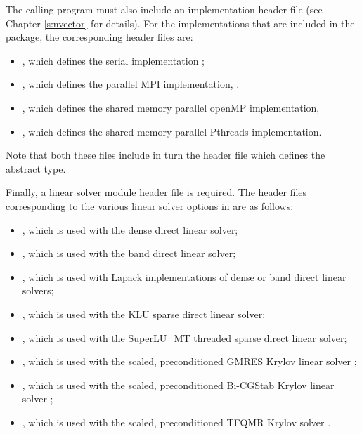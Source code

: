 The calling program must also include an {\nvector} implementation header file
(see Chapter \ref{s:nvector} for details).
For the {\nvector} implementations that are included in the {\idas} package,
the corresponding header files are:
\begin{itemize}
\item {}, 
  which defines the serial implementation {\nvecs};
\item {}, 
  which defines the parallel MPI implementation, {\nvecp}.
\item {},
  which defines the shared memory parallel openMP implementation,
\item {},
  which defines the shared memory parallel Pthreads implementation.
\end{itemize}
Note that both these files include in turn the header file  which 
defines the abstract  type. 

Finally, a linear solver module header file is required. 
The header files corresponding to the various linear solver options in {\idas} are
as follows:
\begin{itemize}
\item {}, 
  which is used with the dense direct linear solver;

\item {}, 
  which is used with the band direct linear solver;

\item {},
  which is used with Lapack implementations of dense or band direct linear solvers;
  
\item {}, 
  which is used with the KLU sparse direct linear solver;

\item {}, 
  which is used with the SuperLU\_MT threaded sparse direct linear solver;

\item {}, 
  which is used with the scaled, preconditioned GMRES Krylov linear solver {\spgmr};

\item {}, 
  which is used with the scaled, preconditioned Bi-CGStab Krylov linear solver {\spbcg};

\item {}, 
  which is used with the scaled, preconditioned TFQMR Krylov solver {\sptfqmr}.
\end{itemize}

